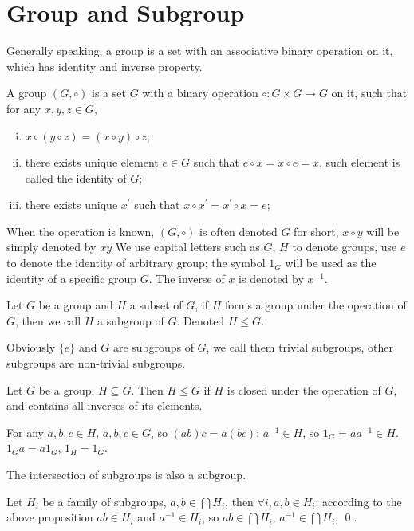 \section{Group and Subgroup}
Generally speaking, a group is a set with an associative binary operation on it,
which has identity and inverse property.
\begin{defi}[group]
A group $(G, \circ)$ is a set $G$ with a binary operation $\circ : G \times G \to G$ on it,
such that for any $x, y, z \in G$,
\begin{enumerate}[i).]
\item $x \circ (y \circ z) = (x \circ y) \circ z$;
\item there exists unique element $e \in G$ such that $e \circ x = x \circ e = x$,
such element is called the identity of $G$;
\item there exists unique $x^\prime$ such that $x \circ x^\prime = x^\prime \circ x = e$;
\end{enumerate}
\end{defi}
When the operation is known, $(G, \circ)$ is often denoted $G$ for short, $x \circ y$ will be simply denoted by $xy$
We use capital letters such as $G$, $H$ to denote groups, use $e$ to denote the identity of arbitrary group;
the symbol $1_G$ will be used as the identity of a specific group $G$. The inverse of $x$ is denoted by $x^{-1}$.
\begin{defi}[subgroup]
Let $G$ be a group and $H$ a subset of $G$, if $H$ forms a group under the operation of $G$, then we call $H$ a subgroup of $G$.
Denoted $H \leq G$.
\end{defi}
Obviously $\{e\}$ and $G$ are subgroups of $G$, we call them trivial subgroups, other subgroups are non-trivial subgroups.
\begin{pro}
Let $G$ be a group, $H \subseteq G$. Then $H \leq G$ if
$H$ is closed under the operation of $G$, and contains all inverses of its elements.
\end{pro}
\begin{prf}
For any $a, b, c \in H$, $a, b, c \in G$, so $(ab)c = a(bc)$;
$a^{-1} \in H$, so $1_G = a a^{-1} \in H$.
$1_G a = a 1_G$, $1_H = 1_G$.
\end{prf}
\begin{pro}
The intersection of subgroups is also a subgroup.
\end{pro}
\begin{prf}
Let $H_i$ be a family of subgroups, $a, b \in \bigcap H_i$,
then $\forall i, a, b \in H_i$; according to the above proposition $ab \in H_i$ and $a^{-1} \in H_i$,
so $ab \in \bigcap H_i$, $a^{-1} \in \bigcap H_i$, \qed.
\end{prf}
